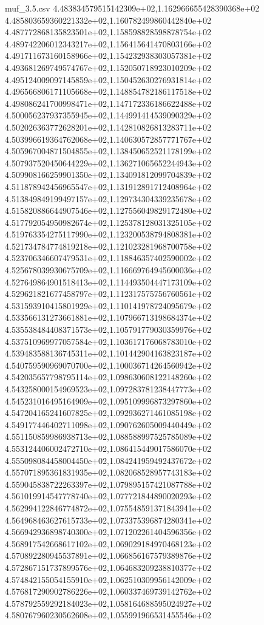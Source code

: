 \begin{filecontents*}{muf_3.5.csv}
4.483834579515142309e+02,1.162966655428390368e+02
4.485803659360221332e+02,1.160782499860442840e+02
4.487772868135823501e+02,1.158598828598878754e+02
4.489742206012343217e+02,1.156415641470803166e+02
4.491711673160158966e+02,1.154232938303057381e+02
4.493681269749574767e+02,1.152050718923010209e+02
4.495124009097145859e+02,1.150452630276931814e+02
4.496566806171105668e+02,1.148854782186117518e+02
4.498086241700998471e+02,1.147172336186622488e+02
4.500056237937355945e+02,1.144991414539090329e+02
4.502026363772628201e+02,1.142810826813283711e+02
4.503996619364762068e+02,1.140630572857771767e+02
4.505967004871504855e+02,1.138450652521178199e+02
4.507937520450644229e+02,1.136271065652244943e+02
4.509908166259901350e+02,1.134091812099704839e+02
4.511878942456965547e+02,1.131912891712408964e+02
4.513849849199497157e+02,1.129734304339235678e+02
4.515820886644907546e+02,1.127556049829172480e+02
4.517792054950982674e+02,1.125378128031325105e+02
4.519763354275117990e+02,1.123200538794808381e+02
4.521734784774819218e+02,1.121023281968700758e+02
4.523706346607479531e+02,1.118846357402590002e+02
4.525678039930675709e+02,1.116669764945600036e+02
4.527649864901518413e+02,1.114493504447173109e+02
4.529621821677458797e+02,1.112317575756760561e+02
4.531593910415801929e+02,1.110141978724095679e+02
4.533566131273661881e+02,1.107966713198684374e+02
4.535538484408371573e+02,1.105791779030359976e+02
4.537510969977057584e+02,1.103617176068783010e+02
4.539483588136745311e+02,1.101442904163823187e+02
4.540759590969070700e+02,1.100036714264560942e+02
4.542035657798795114e+02,1.098630608122148260e+02
4.543258000154969523e+02,1.097283781238447773e+02
4.545231016495164909e+02,1.095109996873297860e+02
4.547204165241607825e+02,1.092936271461085198e+02
4.549177446402711098e+02,1.090762605009440449e+02
4.551150859986938713e+02,1.088588997525785089e+02
4.553124406002472710e+02,1.086415449017586070e+02
4.555098084458004450e+02,1.084241959492437672e+02
4.557071895361831935e+02,1.082068528957743183e+02
4.559045838722263397e+02,1.079895157421087788e+02
4.561019914547778740e+02,1.077721844890020293e+02
4.562994122846774872e+02,1.075548591371843941e+02
4.564968463627615733e+02,1.073375396874280341e+02
4.566942936898740300e+02,1.071202261404596356e+02
4.568917542668617102e+02,1.069029184970468123e+02
4.570892280945537891e+02,1.066856167579389876e+02
4.572867151737899576e+02,1.064683209238810377e+02
4.574842155054155910e+02,1.062510309956142009e+02
4.576817290902786226e+02,1.060337469739142762e+02
4.578792559292184023e+02,1.058164688595024927e+02
4.580767960230562608e+02,1.055991966531455546e+02

\end{filecontents*}
